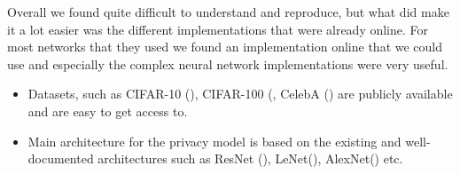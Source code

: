 
Overall we found \cite{xiang2020interpretable} quite difficult to understand and reproduce, but what did make it a lot easier was the different implementations that were already online. For most networks that they used we found an implementation online that we could use and especially the complex neural network implementations were very useful. 

\begin{itemize}
    \item Datasets, such as CIFAR-10 (\cite{cifar10}), CIFAR-100 (\cite{cifar100}, CelebA (\cite{CelebA}) are publicly available and are easy to get access to.
    \item Main architecture for the privacy model is based on the existing and well-documented architectures such as ResNet (\cite{DBLP:journals/corr/HeZRS15}), LeNet(\cite{lecun1998gradient}), AlexNet(\cite{AlexNet}) etc.
\end{itemize}


